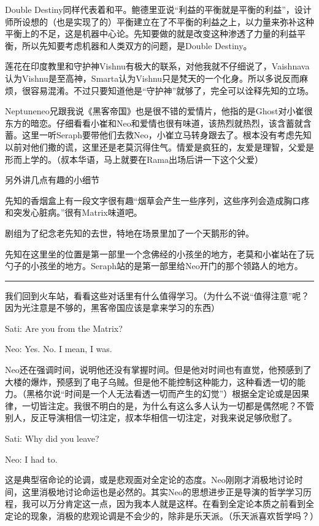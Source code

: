 \documentclass[UTF8]{ctexart}
\newcommand{\myparsep}{\noindent \rule[0.5ex]{\linewidth}{1pt}}
\newenvironment{myquote}{\color{green} \setlength{\leftskip}{6em} \setlength{\rightskip}{4em} \setlength{\parindent}{-2em}}{\par}
\begin{document}
Double Destiny同样代表着和平。鲍德里亚说“利益的平衡就是平衡的利益”，设计师所设想的（也是实现了的）平衡建立在了不平衡的利益之上，以力量来弥补这种平衡上的不足，这是机器中心论。先知要做的就是改变这种渗透了力量的利益平衡，所以先知要考虑机器和人类双方的问题，是Double Destiny。

莲花在印度教里和守护神Vishnu有极大的联系，对他我就不仔细说了，Vaishnava认为Vishnu是至高神，Smarta认为Vishnu只是梵天的一个化身。所以多说反而麻烦，很容易混淆。不过只要知道他是“守护神”就够了，完全可以诠释先知的立场。

Neptuneneo兄跟我说《黑客帝国》也是很不错的爱情片，他指的是Ghost对小崔很东方的暗恋。仔细看看小崔和Neo和爱情也很有味道，该热烈就热烈，该含蓄就含蓄。这里一听Seraph要带他们去救Neo，小崔立马转身跟去了。根本没有考虑先知以前对他们撒的谎，这里还是老莫沉得住气。情爱是疯狂的，友爱是理智，父爱是形而上学的。（叔本华语，马上就要在Rama出场后讲一下这个父爱）

另外讲几点有趣的小细节

先知的香烟盒上有一段文字很有趣“烟草会产生一些序列，这些序列会造成胸口疼和突发心脏病。”很有Matrix味道吧。

剧组为了纪念老先知的去世，特地在场景里加了一个天鹅形的钟。

先知在这里坐的位置是第一部里一个念佛经的小孩坐的地方，老莫和小崔站在了玩勺子的小孩坐的地方。Seraph站的是第一部里给Neo开门的那个领路人的地方。

\myparsep

我们回到火车站，看看这些对话里有什么值得学习。（为什么不说“值得注意”呢？因为光注意是不够的，黑客帝国应该是拿来学习的东西）

\begin{myquote}
Sati: Are you from the Matrix?

Neo: Yes. No. I mean, I was.
\end{myquote}

Neo还在强调时间，说明他还没有掌握时间。但是他对时间也有直觉，他预感到了大楼的爆炸，预感到了电子乌贼。但是他不能控制这种能力，这种看透一切的能力。（黑格尔说“时间是一个人无法看透一切而产生的幻觉”）根据全定论或是因果律，一切皆注定。我很不明白的是，为什么有这么多人认为一切都是偶然呢？不管别人，反正导演相信一切注定，叔本华相信一切注定，对我来说足够欣慰了。

\begin{myquote}
Sati: Why did you leave?

Neo: I had to.
\end{myquote}

这是典型宿命论的论调，或是悲观面对全定论的态度。Neo刚刚才消极地讨论时间，这里消极地讨论命运也是必然的。其实Neo的思想进步正是导演的哲学学习历程，我可以万分肯定这一点，因为我本人就是这样。在看到全定论本质之前看到全定论的现象，消极的悲观论调是不会少的，除非是乐天派。（乐天派喜欢哲学吗？）
\end{document}
